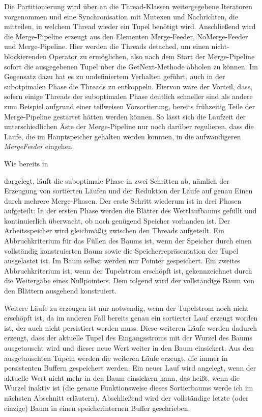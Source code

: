 \documentclass[a4paper,12pt,twoside]{article}
\newcommand{\Fb}[1]{\textit{#1}} %
\begin{document}
Die Partitionierung wird über an die Thread-Klassen weitergegebene Iteratoren vorgenommen und eine Synchronisation mit Mutexen und Nachrichten, die mitteilen, in welchem Thread wieder ein Tupel benötigt wird. Anschließend wird die Merge-Pipeline erzeugt aus den Elementen Merge-Feeder, NoMerge-Feeder und Merge-Pipeline. Hier werden die Threads detached, um einen nicht-blockierenden Operator zu ermöglichen, also nach dem Start der Merge-Pipeline sofort die ausgegebenen Tupel über die GetNext-Methode abholen zu können. Im Gegensatz dazu hat es zu undefiniertem Verhalten geführt, auch in der subotpimalen Phase die Threads zu entkoppeln. Hiervon wäre der Vorteil, dass, sofern einige Threads der suboptimalen Phase deutlich schneller sind als andere zum Beispiel aufgrund einer teilweisen Vorsortierung, bereits frühzeitig Teile der Merge-Pipeline gestartet hätten werden können. So lässt sich die Laufzeit der unterschiedlichen Äste der Merge-Pipeline nur noch darüber regulieren, dass die Läufe, die im Hauptspeicher gehalten werden konnten, in die aufwändigeren \Fb{MergeFeeder} eingehen.

Wie bereits in \author{Entwicklung} dargelegt, läuft die suboptimale Phase in zwei Schritten ab, nämlich der Erzeugung von sortierten Läufen und der Reduktion der Läufe auf genau Einen durch mehrere Merge-Phasen. Der erste Schritt wiederum ist in drei Phasen aufgeteilt: In der ersten Phase werden die Blätter des Wettlaufbaums gefüllt und kontinuierlich überwacht, ob noch genügend Speicher vorhanden ist. Der Arbeitsspeicher wird gleichmäßig zwischen den Threads aufgeteilt. Ein Abbruchkriterium für das Füllen des Baums ist, wenn der Speicher durch einen vollständig konstruierten Baum sowie die Speicherrepräsentation der Tupel ausgelastet ist. Im Baum selbst werden nur Pointer gespeichert. Ein zweites Abbruchkriterium ist, wenn der Tupelstrom erschöpft ist, gekennzeichnet durch die Weitergabe eines Nullpointers. Dem folgend wird der vollständige Baum von den Blättern ausgehend konstruiert.

Weitere Läufe zu erzeugen ist nur notwendig, wenn der Tupelstrom noch nicht erschöpft ist, da im anderen Fall bereits genau ein sortierter Lauf erzeugt worden ist, der auch nicht persistiert werden muss. Diese weiteren Läufe werden dadurch erzeugt, dass der aktuelle Tupel des Eingangsstroms mit der Wurzel des Baums ausgetauscht wird und dieser neue Wert weiter in den Baum einsickert. Aus den ausgetauschten Tupeln werden die weiteren Läufe erzeugt, die immer in persistenten Buffern gespeichert werden. Ein neuer Lauf wird angelegt, wenn der aktuelle Wert nicht mehr in den Baum einsickern kann, das heißt, wenn die Wurzel inaktiv ist (die genaue Funktionsweise dieses Sortierbaums werde ich im nächsten Abschnitt erläutern). Abschließend wird der vollständige letzte (oder einzige) Baum in einen speicherinternen Buffer geschrieben.
\end{document}
